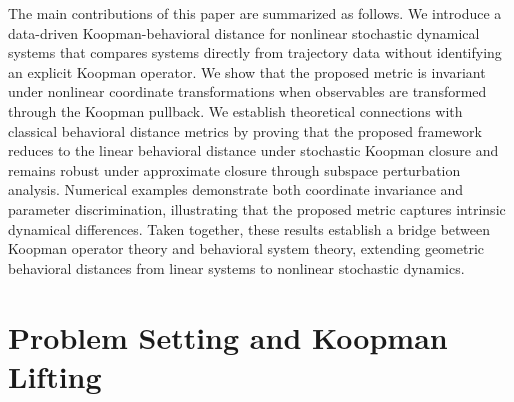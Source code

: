 \documentclass[letterpaper, 10 pt, conference]{ieeeconf}  %
\begin{document}
The main contributions of this paper are summarized as follows. We introduce a data-driven Koopman-behavioral distance for nonlinear stochastic dynamical systems that compares systems directly from trajectory data without identifying an explicit Koopman operator. 
We show that the proposed metric is invariant under nonlinear coordinate transformations when observables are transformed through the Koopman pullback. We establish theoretical connections with classical behavioral distance metrics by proving that the proposed framework reduces to the linear behavioral distance under stochastic Koopman closure and remains robust under approximate closure through subspace perturbation analysis.
Numerical examples demonstrate both coordinate invariance and parameter discrimination, illustrating that the proposed metric captures intrinsic dynamical differences. Taken together, these results establish a bridge between Koopman operator theory and behavioral system theory, extending geometric behavioral distances from linear systems to nonlinear stochastic dynamics.











\section{Problem Setting and Koopman Lifting}
\label{sec:setting}
\end{document}
